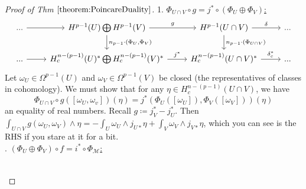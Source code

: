 \documentclass[10pt]{article}
\theoremstyle{plain}
\theoremstyle{definition}
\newcommand{\man}{\mathcal{M}}
\newcommand{\UintV}{U\cap V}
\begin{document}
\begin{proof}[Proof of Thm $\ref{theorem:PoincareDuality}$]
1. \underline{$\Phi_{\UintV} \circ g = j^* \circ (\Phi_U \oplus \Phi_V)$:}
$$%
\begin{tikzcd}
... \arrow[r] & H^{p-1}(U)\bigoplus H^{p-1}(V) \arrow[r, "g"] \arrow[d, "{n_{p-1}\cdot(\Phi_U,\Phi_V)}"] & H^{p-1}(U\cap V) \arrow[r, "\delta"] \arrow[d, "n_{p-1}\cdot(\Phi_{U\cap V})"] & ... \\
... \arrow[r] & H^{n-(p-1)}_c(U)^*\bigoplus H^{n-(p-1)}_c(V)^* \arrow[r, "j^*"]                          & H^{n-(p-1)}_c(U\cap V)^* \arrow[r, "\delta_c^*"]                                 & ...
\end{tikzcd}$$
Let $\omega_U \in \Omega^{p-1}(U)$ and $\omega_V \in \Omega^{p-1}(V)$ be closed (the representatives of classes in cohomology). We must show that for any $\eta \in H^{n-(p-1)}_c(\UintV)$, we have 
$$\Phi_{\UintV} \circ g([\omega_U,\omega_v])(\eta) = j^*(\Phi_U([\omega_U]),\Phi_V([\omega_V]))(\eta)$$
an equality of real numbers. Recall $g \coloneqq j_V^* - j_U^*.$ Then $\int_{\UintV} g(\omega_U,\omega_V) \wedge \eta = - \int_U \omega_U\wedge j_{U*} \eta + \int_V \omega_V \wedge j_{V*}\eta$, which you can see is the RHS if you stare at it for a bit.\\
. \underline{$(\Phi_U\oplus\Phi_V) \circ f = i^* \circ \Phi_\man$:}
$$%
\begin{tikzcd}

\end{tikzcd}$$
\end{proof}
\end{document}
